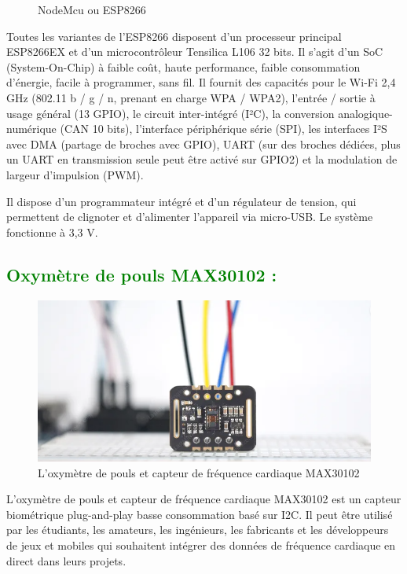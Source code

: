 \begin{flushleft}
\begin{figure}[h]
			\caption{NodeMcu ou ESP8266}
			\label{fig:labelname}
		\end{figure}
		Toutes les variantes de l’ESP8266 disposent d’un processeur principal ESP8266EX et d’un microcontrôleur Tensilica L106 32 bits. Il s’agit d’un SoC (System-On-Chip) à faible coût, haute performance, faible consommation d’énergie, facile à programmer, sans fil. Il fournit des capacités pour le Wi-Fi 2,4 GHz (802.11 b / g / n, prenant en charge WPA / WPA2), l’entrée / sortie à usage général (13 GPIO), le circuit inter-intégré (I²C), la conversion analogique-numérique (CAN 10 bits), l’interface périphérique série (SPI), les interfaces I²S avec DMA (partage de broches avec GPIO), UART (sur des broches dédiées, plus un UART en transmission seule peut être activé sur GPIO2) et la modulation de largeur d’impulsion (PWM).\newline
		
		Il dispose d’un programmateur intégré et d’un régulateur de tension, qui permettent de clignoter et d’alimenter l’appareil via micro-USB. Le système fonctionne à 3,3 V.\newpage
	
		\subsection{\textcolor{green}{Oxymètre de pouls MAX30102 :}}
			\begin{figure}[h]
			\centering
			\includegraphics{chapitres/images/Capteur1.PNG}
			\caption{L’oxymètre de pouls et capteur de fréquence cardiaque MAX30102}
			\label{fig:labelname}
			\end{figure}
		L’oxymètre de pouls et capteur de fréquence cardiaque MAX30102 est un capteur biométrique plug-and-play basse consommation basé sur I2C. Il peut être utilisé par les étudiants, les amateurs, les ingénieurs, les fabricants et les développeurs de jeux et mobiles qui souhaitent intégrer des données de fréquence cardiaque en direct dans leurs projets.\newline
		

\end{flushleft}
